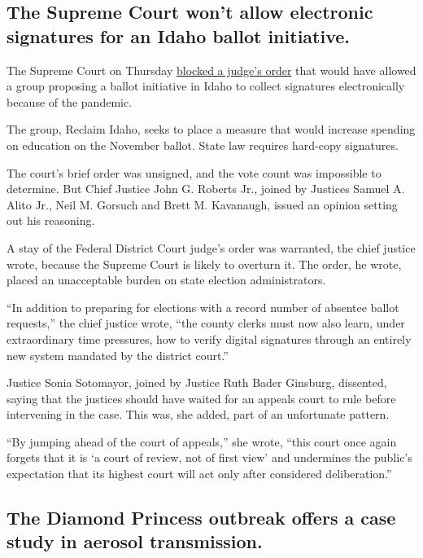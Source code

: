 \hypertarget{the-supreme-court-wont-allow-electronic-signatures-for-an-idaho-ballot-initiative}{%
\subsection{The Supreme Court won't allow electronic signatures for an
Idaho ballot
initiative.}\label{the-supreme-court-wont-allow-electronic-signatures-for-an-idaho-ballot-initiative}}

The Supreme Court on Thursday
\href{https://www.supremecourt.gov/opinions/19pdf/20a18_f2qg.pdf}{blocked
a judge's order} that would have allowed a group proposing a ballot
initiative in Idaho to collect signatures electronically because of the
pandemic.

The group, Reclaim Idaho, seeks to place a measure that would increase
spending on education on the November ballot. State law requires
hard-copy signatures.

The court's brief order was unsigned, and the vote count was impossible
to determine. But Chief Justice John G. Roberts Jr., joined by Justices
Samuel A. Alito Jr., Neil M. Gorsuch and Brett M. Kavanaugh, issued an
opinion setting out his reasoning.

A stay of the Federal District Court judge's order was warranted, the
chief justice wrote, because the Supreme Court is likely to overturn it.
The order, he wrote, placed an unacceptable burden on state election
administrators.

``In addition to preparing for elections with a record number of
absentee ballot requests,'' the chief justice wrote, ``the county clerks
must now also learn, under extraordinary time pressures, how to verify
digital signatures through an entirely new system mandated by the
district court.''

Justice Sonia Sotomayor, joined by Justice Ruth Bader Ginsburg,
dissented, saying that the justices should have waited for an appeals
court to rule before intervening in the case. This was, she added, part
of an unfortunate pattern.

``By jumping ahead of the court of appeals,'' she wrote, ``this court
once again forgets that it is `a court of review, not of first view' and
undermines the public's expectation that its highest court will act only
after considered deliberation.''

\hypertarget{the-diamond-princess-outbreak-offers-a-case-study-in-aerosol-transmission}{%
\subsection{The Diamond Princess outbreak offers a case study in aerosol
transmission.}\label{the-diamond-princess-outbreak-offers-a-case-study-in-aerosol-transmission}}

